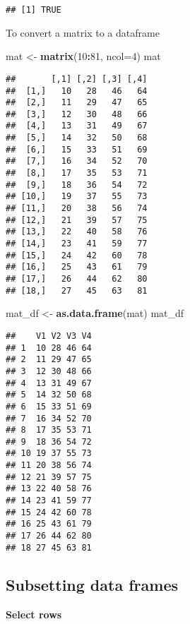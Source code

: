 \documentclass[]{book}
\newenvironment{Shaded}{\begin{snugshade}}{\end{snugshade}}
\newcommand{\DataTypeTok}[1]{\textcolor[rgb]{0.13,0.29,0.53}{#1}}
\newcommand{\DecValTok}[1]{\textcolor[rgb]{0.00,0.00,0.81}{#1}}
\newcommand{\KeywordTok}[1]{\textcolor[rgb]{0.13,0.29,0.53}{\textbf{#1}}}
\newcommand{\NormalTok}[1]{#1}
\newcommand{\OperatorTok}[1]{\textcolor[rgb]{0.81,0.36,0.00}{\textbf{#1}}}
\newcommand{\StringTok}[1]{\textcolor[rgb]{0.31,0.60,0.02}{#1}}
\begin{document}
\begin{verbatim}
## [1] TRUE
\end{verbatim}

To convert a matrix to a dataframe

\begin{Shaded}
\begin{Highlighting}[]
\NormalTok{mat <-}\StringTok{ }\KeywordTok{matrix}\NormalTok{(}\DecValTok{10}\OperatorTok{:}\DecValTok{81}\NormalTok{, }\DataTypeTok{ncol=}\DecValTok{4}\NormalTok{)}
\NormalTok{mat}
\end{Highlighting}
\end{Shaded}

\begin{verbatim}
##       [,1] [,2] [,3] [,4]
##  [1,]   10   28   46   64
##  [2,]   11   29   47   65
##  [3,]   12   30   48   66
##  [4,]   13   31   49   67
##  [5,]   14   32   50   68
##  [6,]   15   33   51   69
##  [7,]   16   34   52   70
##  [8,]   17   35   53   71
##  [9,]   18   36   54   72
## [10,]   19   37   55   73
## [11,]   20   38   56   74
## [12,]   21   39   57   75
## [13,]   22   40   58   76
## [14,]   23   41   59   77
## [15,]   24   42   60   78
## [16,]   25   43   61   79
## [17,]   26   44   62   80
## [18,]   27   45   63   81
\end{verbatim}

\begin{Shaded}
\begin{Highlighting}[]
\NormalTok{mat_df <-}\StringTok{ }\KeywordTok{as.data.frame}\NormalTok{(mat)}
\NormalTok{mat_df}
\end{Highlighting}
\end{Shaded}

\begin{verbatim}
##    V1 V2 V3 V4
## 1  10 28 46 64
## 2  11 29 47 65
## 3  12 30 48 66
## 4  13 31 49 67
## 5  14 32 50 68
## 6  15 33 51 69
## 7  16 34 52 70
## 8  17 35 53 71
## 9  18 36 54 72
## 10 19 37 55 73
## 11 20 38 56 74
## 12 21 39 57 75
## 13 22 40 58 76
## 14 23 41 59 77
## 15 24 42 60 78
## 16 25 43 61 79
## 17 26 44 62 80
## 18 27 45 63 81
\end{verbatim}

\hypertarget{subsetting-data-frames}{%
\subsection{Subsetting data frames}\label{subsetting-data-frames}}

\textbf{Select rows}
\end{document}
